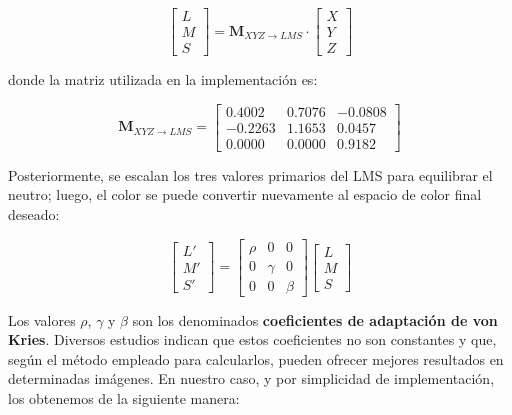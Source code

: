 \documentclass[11pt]{article}
\begin{document}
          \[
              \begin{bmatrix} L \\ M \\ S \end{bmatrix} =
              \mathbf{M}_{XYZ \to LMS} \cdot
              \begin{bmatrix} X \\ Y \\ Z \end{bmatrix}
          \]

          \noindent
          donde la matriz utilizada en la implementación es:

          \[
              \mathbf{M}_{XYZ \to LMS} =
              \begin{bmatrix}
                  0.4002  & 0.7076 & -0.0808 \\
                  -0.2263 & 1.1653 & 0.0457  \\
                  0.0000  & 0.0000 & 0.9182
              \end{bmatrix}
          \]

          \noindent
          Posteriormente, se escalan los tres valores primarios del LMS para equilibrar el neutro; luego, el color se puede convertir nuevamente al espacio de color final deseado:

          \[
              \begin{bmatrix} L' \\ M' \\ S' \end{bmatrix} =
              \begin{bmatrix}
                  \rho & 0      & 0     \\
                  0    & \gamma & 0     \\
                  0    & 0      & \beta
              \end{bmatrix}
              \begin{bmatrix} L \\ M \\ S \end{bmatrix}
          \]

          \clearpage

          Los valores \(\rho\), \(\gamma\) y \(\beta\) son los denominados
          \textbf{coeficientes de adaptación de von Kries}. Diversos estudios indican que
          estos coeficientes no son constantes y que, según el método empleado para
          calcularlos, pueden ofrecer mejores resultados en determinadas imágenes. En
          nuestro caso, y por simplicidad de implementación, los obtenemos de la
          siguiente manera:~\cite{Buenaposada2001VariationsOG}
\end{document}
